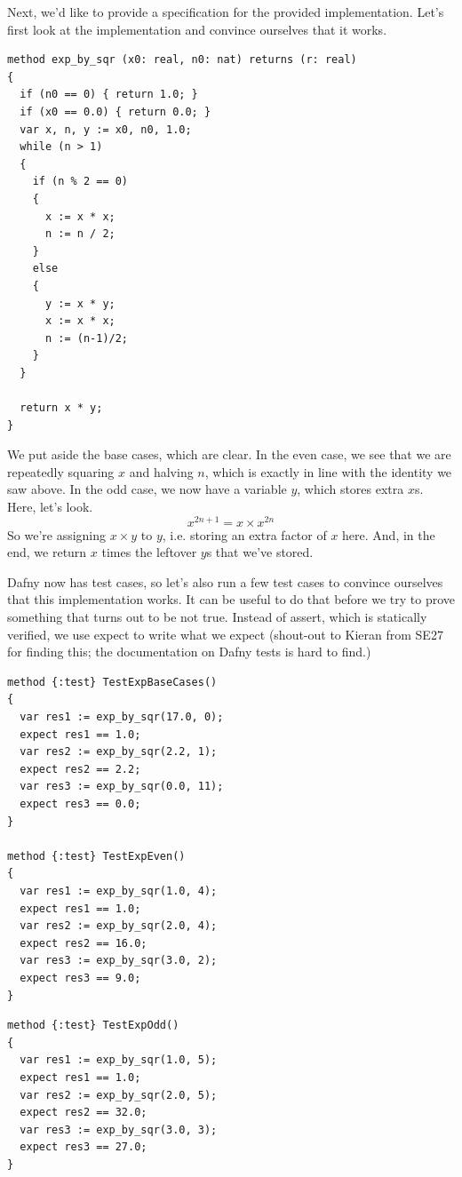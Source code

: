 \documentclass[11pt]{article}
\begin{document}
Next, we'd like to provide a specification for the provided implementation. Let's first look at the implementation and convince ourselves that it works.
\begin{lstlisting}[language=dafny]
method exp_by_sqr (x0: real, n0: nat) returns (r: real)
{
  if (n0 == 0) { return 1.0; }
  if (x0 == 0.0) { return 0.0; }
  var x, n, y := x0, n0, 1.0;
  while (n > 1)
  {
    if (n % 2 == 0)
    {
      x := x * x;
      n := n / 2;
    }
    else
    {
      y := x * y;
      x := x * x;
      n := (n-1)/2;
    }
  }

  return x * y;
}
\end{lstlisting}
We put aside the base cases, which are clear.
In the even case, we see that we are repeatedly squaring $x$ and halving $n$, which is exactly in line with the identity we saw above.
In the odd case, we now have a variable $y$, which stores extra $x$s. Here, let's look.
\[ x^{2n+1} = x \times x^{2n} \]
So we're assigning $x \times y$ to $y$, i.e. storing an extra factor of $x$ here. And, in the end, we return $x$ times the leftover $y$s
that we've stored.

Dafny now has test cases, so let's also run a few test cases to convince ourselves that this implementation works.
It can be useful to do that before we try to prove something that turns out to be not true. Instead of \textsf{assert},
which is statically verified, we use \textsf{expect} to write what we expect (shout-out to Kieran from SE27 for finding this; the documentation on Dafny tests
is hard to find.)

  \begin{minipage}{.45\textwidth}
\begin{lstlisting}[language=dafny]
method {:test} TestExpBaseCases()
{
  var res1 := exp_by_sqr(17.0, 0);
  expect res1 == 1.0;
  var res2 := exp_by_sqr(2.2, 1);
  expect res2 == 2.2;
  var res3 := exp_by_sqr(0.0, 11);
  expect res3 == 0.0;
}

method {:test} TestExpEven()
{
  var res1 := exp_by_sqr(1.0, 4);
  expect res1 == 1.0;
  var res2 := exp_by_sqr(2.0, 4);
  expect res2 == 16.0;
  var res3 := exp_by_sqr(3.0, 2);
  expect res3 == 9.0;
}
\end{lstlisting}
\end{minipage}
  \begin{minipage}{.45\textwidth}
\begin{lstlisting}[language=dafny]
method {:test} TestExpOdd()
{
  var res1 := exp_by_sqr(1.0, 5);
  expect res1 == 1.0;
  var res2 := exp_by_sqr(2.0, 5);
  expect res2 == 32.0;
  var res3 := exp_by_sqr(3.0, 3);
  expect res3 == 27.0;
}
\end{lstlisting}
  \end{minipage}
\end{document}
